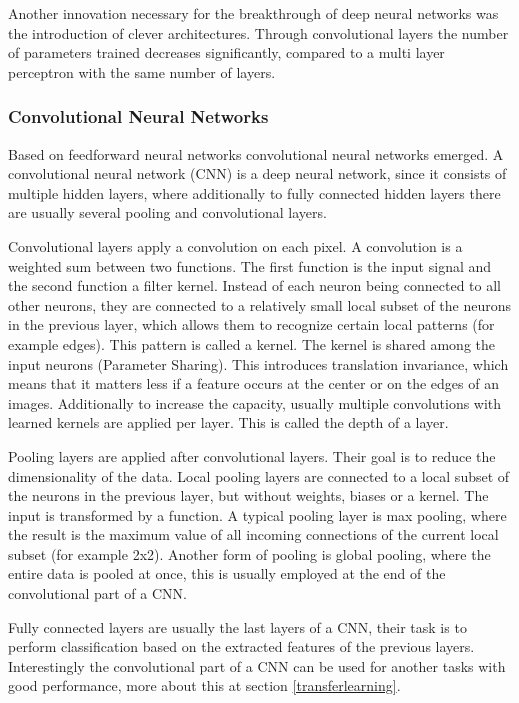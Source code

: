 \documentclass[draft,final,oneside]{vutinfth} %
\begin{document}
Another innovation necessary for the breakthrough of deep neural networks was the introduction of clever architectures. Through convolutional layers the number of parameters trained decreases significantly, compared to a multi layer perceptron with the same number of layers.

\subsubsection{Convolutional Neural Networks} \label{mlcnn}

Based on feedforward neural networks convolutional neural networks emerged. A convolutional neural network (CNN) is a deep neural network, since it consists of multiple hidden layers, where additionally to fully connected hidden layers there are usually several pooling and convolutional layers.

Convolutional layers apply a convolution on each pixel. A convolution is a weighted sum between two functions. The first function is the input signal and the second function a filter kernel. Instead of each neuron being connected to all other neurons, they are connected to a relatively small local subset of the neurons in the previous layer, which allows them to recognize certain local patterns (for example edges). This pattern is called a kernel. The kernel is shared among the input neurons (Parameter Sharing). This introduces translation invariance, which means that it matters less if a feature occurs at the center or on the edges of an images. Additionally to increase the capacity, usually multiple convolutions with learned kernels are applied per layer. This is called the depth of a layer.

Pooling layers are applied after convolutional layers. Their goal is to reduce the dimensionality of the data. Local pooling layers are connected to a local subset of the neurons in the previous layer, but without weights, biases or a kernel. The input is transformed by a function. A typical pooling layer is max pooling, where the result is the maximum value of all incoming connections of the current local subset (for example 2x2). Another form of pooling is global pooling, where the entire data is pooled at once, this is usually employed at the end of the convolutional part of a CNN.

Fully connected layers are usually the last layers of a CNN, their task is to perform classification based on the extracted features of the previous layers. Interestingly the convolutional part of a CNN can be used for another tasks with good performance, more about this at section \ref{transferlearning}.
\end{document}

